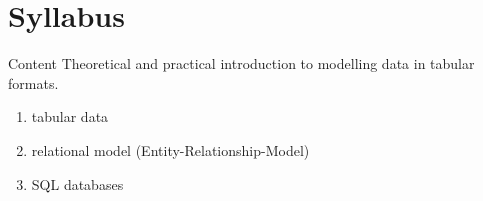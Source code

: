 \section{Syllabus}
\begin{frame}{Content}
Theoretical and practical introduction to modelling data in tabular formats. 

\begin{enumerate}
    \item tabular data
    \item relational model (Entity-Relationship-Model) 
    \item SQL databases
\end{enumerate}

\end{frame}
 
